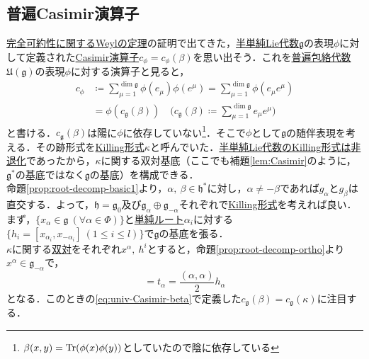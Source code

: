 \documentclass[rep_main]{subfiles}
\begin{document}
\subsection{普遍Casimir演算子}
\hyperref[thm:Weyl]{完全可約性に関するWeylの定理}の証明で出てきた，\hyperref[def:semisimple-LieAlg]{半単純Lie代数}$\mathfrak{g}$の表現$\phi$に対して定義された\hyperref[def:Casimir]{Casimir演算子}$c_\phi = c_\phi(\beta)$を思い出そう．これを\hyperref[def:univ-env-alg]{普遍包絡代数}$\mathfrak{U}(\mathfrak{g})$の表現$\phi$に対する演算子と見ると，
\begin{align}
	c_\phi &\coloneqq \sum_{\mu=1}^{\dim\mathfrak{g}} \phi(e_\mu)\phi(e^\mu) = \sum_{\mu=1}^{\dim\mathfrak{g}} \phi(e_\mu e^\mu) \\
	\label{eq:univ-Casimir-beta}
	&= \phi(c_\mathfrak{g}(\beta))\quad  \biggl(c_\mathfrak{g}(\beta) \coloneqq \sum_{\mu=1}^{\dim\mathfrak{g}} e_\mu e^\mu \biggr)
\end{align}
と書ける．$c_\mathfrak{g}(\beta)$は陽に$\phi$に依存していない\footnote{$\beta(x, y) = \Tr(\phi(x)\phi(y))$としていたので陰に依存している}．そこで$\phi$として$\mathfrak{g}$の随伴表現を考える．その跡形式を\hyperref[def:Killing-form]{Killing形式}$\kappa$と呼んでいた．\hyperref[thm:semisimple-LieAlg-iff]{半単純Lie代数のKilling形式は非退化}であったから，$\kappa$に関する双対基底（ここでも補題\ref{lem:Casimir}のように，$\mathfrak{g}^*$の基底ではなく$\mathfrak{g}$の基底）を構成できる．\\
命題\ref{prop:root-decomp-basic1}より，$\alpha,\ \beta \in \mathfrak{h}^*$に対し，$\alpha \neq -\beta$であれば$g_\alpha$と$g_\beta$は直交する．よって，$\mathfrak{h} = \mathfrak{g}_0$及び$\mathfrak{g}_\alpha \oplus \mathfrak{g}_{-\alpha}$それぞれで\hyperref[def:Killing-form]{Killing形式}を考えれば良い．\\
まず，$\{x_\alpha \in \mathfrak{g}\ (\forall \alpha \in \Phi)\}$と\hyperref[def:base-root]{単純ルート}$\alpha_i$に対する$\{h_i = [x_{\alpha_i}, x_{-\alpha_i}]\ (1 \leq i \leq l)\}$で$\mathfrak{g}$の基底を張る．\\
$\kappa$に関する\hyperref[lem:Casimir]{双対}をそれぞれ$x^\alpha,\ h^i$とすると，命題\ref{prop:root-decomp-ortho}より$x^\alpha \in \mathfrak{g}_{-\alpha}$で，
\begin{equation}
	[x_\alpha, x^\alpha] = t_\alpha = \frac{(\alpha, \alpha)}{2}h_\alpha
\end{equation}
となる．このときの\eqref{eq:univ-Casimir-beta}で定義した$c_\mathfrak{g}(\beta) = c_\mathfrak{g}(\kappa)$に注目する．
\end{document}
